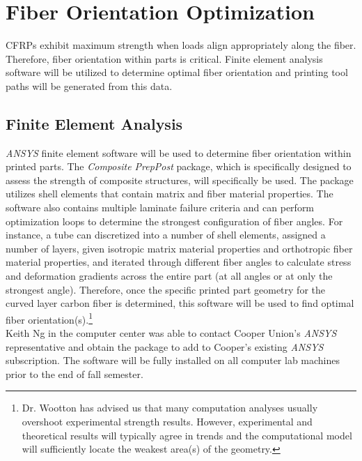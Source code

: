 \section{Fiber Orientation Optimization}

\indent

CFRPs exhibit maximum strength when loads align appropriately along the fiber. Therefore, fiber orientation within parts is critical. Finite element analysis software will be utilized to determine optimal fiber orientation and printing tool paths will be generated from this data.

\subsection{Finite Element Analysis}

\indent

\emph{ANSYS} finite element software will be used to determine fiber orientation within printed parts. The \emph{Composite PrepPost} package, which is specifically designed to assess the strength of composite structures, will specifically be used. The package utilizes shell elements that contain matrix and fiber material properties. The software also contains multiple laminate failure criteria and can perform optimization loops to determine the strongest configuration of fiber angles. For instance, a tube can discretized into a number of shell elements, assigned a number of layers, given isotropic matrix material properties and orthotropic fiber material properties, and iterated through different fiber angles to calculate stress and deformation gradients across the entire part (at all angles or at only the strongest angle). Therefore, once the specific printed part geometry for the curved layer carbon fiber is determined, this software will be used to find optimal fiber orientation(s).\footnote{Dr. Wootton has advised us that many computation analyses usually overshoot experimental strength results. However, experimental and theoretical results will typically agree in trends and the computational model will sufficiently locate the weakest area(s) of the geometry.}\\

Keith Ng in the computer center was able to contact Cooper Union's \emph{ANSYS} representative and obtain the package to add to Cooper's existing \emph{ANSYS} subscription. The software will be fully installed on all computer lab machines prior to the end of fall semester.\\

